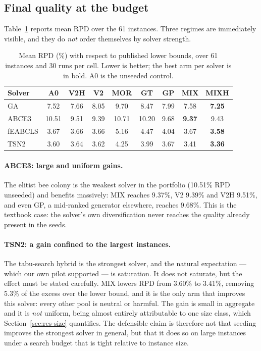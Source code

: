 \documentclass[review]{elsarticle}
\begin{document}
\subsection{Final quality at the budget}\label{sec:res-final}

Table~\ref{tab:rpd} reports mean RPD over the 61 instances. Three regimes
are immediately visible, and they do \emph{not} order themselves by solver
strength.

\begin{table}[htbp]
\centering
\caption{Mean RPD (\%) with respect to published lower bounds, over 61
instances and 30 runs per cell. Lower is better; the best arm per solver is
in bold. A0 is the unseeded control.}
\label{tab:rpd}
\begin{tabular}{lcccccccc}
\toprule
Solver & A0 & V2H & V2 & MOR & GT & GP & MIX & MIXH \\
\midrule
GA      & 7.52 & 7.66 & 8.05 & 9.70 & 8.47 & 7.99 & 7.58 & \textbf{7.25} \\
ABCE3   & 10.51 & 9.51 & 9.39 & 10.71 & 10.20 & 9.68 & \textbf{9.37} & 9.43 \\
fEABCLS & 3.67 & 3.66 & 3.66 & 5.16 & 4.47 & 4.04 & 3.67 & \textbf{3.58} \\
TSN2    & 3.60 & 3.64 & 3.62 & 4.25 & 3.99 & 3.67 & 3.41 & \textbf{3.36} \\
\bottomrule
\end{tabular}
\end{table}


\paragraph{ABCE3: large and uniform gains.} The elitist bee colony is the
weakest solver in the portfolio (10.51\% RPD unseeded) and benefits
massively: MIX reaches 9.37\%, V2 9.39\% and V2H 9.51\%, and even GP, a
mid-ranked generator elsewhere, reaches 9.68\%. This is the textbook case:
the solver's own diversification never reaches the quality already present
in the seeds.

\paragraph{TSN2: a gain confined to the largest instances.} The
tabu-search hybrid is the strongest solver, and the natural expectation ---
which our own pilot supported --- is saturation. It does not saturate, but
the effect must be stated carefully. MIX lowers RPD from 3.60\% to 3.41\%,
removing 5.3\% of the excess over the lower bound, and it is the only arm
that improves this solver: every other pool is neutral or harmful. The gain
is small in aggregate and it is \emph{not} uniform, being almost entirely
attributable to one size class, which Section~\ref{sec:res-size}
quantifies. The defensible claim is
therefore not that seeding improves the strongest solver in general, but that it does
so on large instances under a search budget that is tight relative to
instance size.
\end{document}
